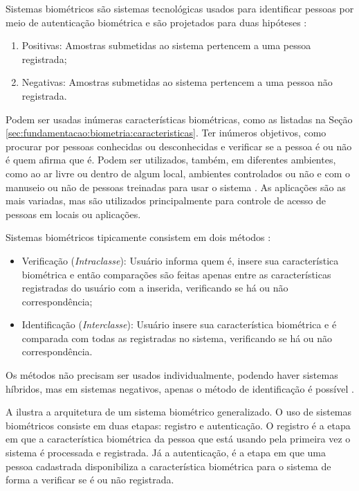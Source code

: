 \par Sistemas biométricos são sistemas tecnológicas usados para identificar pessoas por meio de autenticação biométrica e são projetados para duas hipóteses \cite{wayman2005biometric}: 

\begin{enumerate}
    \item Positivas: Amostras submetidas ao sistema pertencem a uma pessoa registrada;
    \item Negativas: Amostras submetidas ao sistema pertencem a uma pessoa não registrada.
\end{enumerate}

\par Podem ser usadas inúmeras características biométricas, como as listadas na Seção \ref{sec:fundamentacao:biometria:caracteristicas}. Ter inúmeros objetivos, como procurar por pessoas conhecidas ou desconhecidas e verificar se a pessoa é ou não é quem afirma que é. Podem ser utilizados, também, em diferentes ambientes, como ao ar livre ou dentro de algum local, ambientes controlados ou não e com o manuseio ou não de pessoas treinadas para usar o sistema \cite{wayman2005biometric}. As aplicações são as mais variadas, mas são utilizados principalmente para controle de acesso de pessoas em locais ou aplicações.

\par Sistemas biométricos tipicamente consistem em dois métodos \cite{wayman2005biometric}:

\begin{itemize}
    \item Verificação (\textit{Intraclasse}): Usuário informa quem é, insere sua característica biométrica e então comparações são feitas apenas entre as características registradas do usuário com a inserida, verificando se há ou não correspondência;
    \item Identificação (\textit{Interclasse}): Usuário insere sua característica biométrica e é comparada com todas as registradas no sistema, verificando se há ou não correspondência.
\end{itemize}

\par Os métodos não precisam ser usados individualmente, podendo haver sistemas híbridos, mas em sistemas negativos, apenas o método de identificação é possível \cite{wayman2005biometric}.

\par A  ilustra a arquitetura de um sistema biométrico generalizado. O uso de sistemas biométricos consiste em duas etapas: registro e autenticação. O registro é a etapa em que a característica biométrica da pessoa que está usando pela primeira vez o sistema é processada e registrada. Já a autenticação, é a etapa em que uma pessoa cadastrada disponibiliza a característica biométrica para o sistema de forma a verificar se é ou não registrada.

